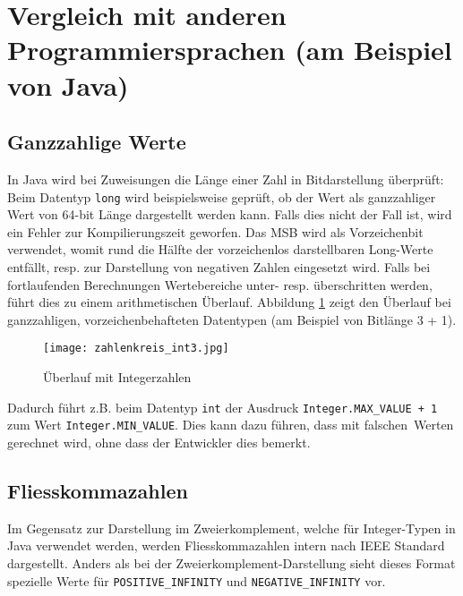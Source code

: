 \documentclass[10pt, a4paper, twocolumn]{article} %
\begin{document}
\section{Vergleich mit anderen Programmiersprachen (am Beispiel von Java)}
\subsection{Ganzzahlige Werte}
In Java wird bei Zuweisungen die Länge einer Zahl in Bitdarstellung überprüft:
Beim Datentyp \texttt{long} wird beispielsweise geprüft, ob der Wert als ganzzahliger Wert von 64-bit Länge dargestellt werden kann.
Falls dies nicht der Fall ist, wird ein Fehler zur Kompilierungszeit geworfen.
Das MSB wird als Vorzeichenbit verwendet, womit rund die Hälfte der vorzeichenlos darstellbaren Long-Werte entfällt, resp. zur Darstellung von negativen Zahlen eingesetzt wird.
Falls bei fortlaufenden Berechnungen Wertebereiche unter- resp. überschritten werden, führt dies zu einem arithmetischen Überlauf.
Abbildung \ref{zahlenkreis} %
zeigt den Überlauf bei ganzzahligen, vorzeichenbehafteten Datentypen (am Beispiel von Bitlänge 3 + 1).

\begin{figure}[H]
    \texttt{[image: zahlenkreis\_int3.jpg]} %
    \caption{Überlauf mit Integerzahlen } %
    \label{zahlenkreis} %
\end{figure}


Dadurch führt z.B. beim Datentyp \texttt{int} der Ausdruck \texttt{Integer.MAX\_VALUE + 1} zum Wert \texttt{Integer.MIN\_VALUE}.
Dies kann dazu führen, dass mit \glqq falschen\grqq \ Werten gerechnet wird, ohne dass der Entwickler dies bemerkt.

\subsection{Fliesskommazahlen}
Im Gegensatz zur Darstellung im Zweierkomplement, welche für Integer-Typen in Java verwendet werden, werden Fliesskommazahlen intern nach IEEE Standard dargestellt.
Anders als bei der Zweierkomplement-Darstellung sieht dieses Format spezielle Werte für \texttt{POSITIVE\_INFINITY} und \texttt{NEGATIVE\_INFINITY} vor.
\end{document}
